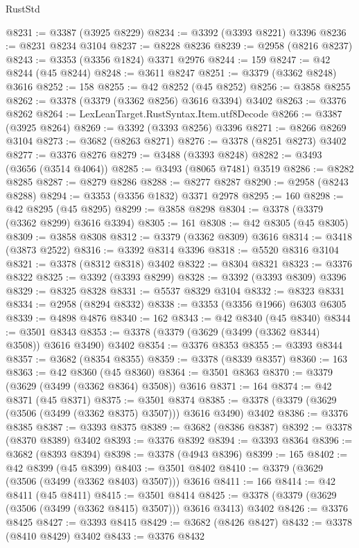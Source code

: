 \begin{lexlean}{RustStd}
\begin{coremodule}
@8231 := @3387 (@3925 @8229)
@8234 := @3392 (@3393 @8221) @3396
@8236 := @8231 @8234 @3104
@8237 := @8228 @8236
@8239 := @2958 (@8216 @8237)
@8243 := @3353 (@3356 @1824) @3371 @2976
@8244 := 159
@8247 := @42 @8244 (@45 @8244)
@8248 := @3611 @8247
@8251 := @3379 (@3362 @8248) @3616
@8252 := 158
@8255 := @42 @8252 (@45 @8252)
@8256 := @3858 @8255
@8262 := @3378 (@3379 (@3362 @8256) @3616 @3394) @3402
@8263 := @3376 @8262
@8264 := LexLeanTarget.RustSyntax.Item.utf8Decode
@8266 := @3387 (@3925 @8264)
@8269 := @3392 (@3393 @8256) @3396
@8271 := @8266 @8269 @3104
@8273 := @3682 (@8263 @8271)
@8276 := @3378 (@8251 @8273) @3402
@8277 := @3376 @8276
@8279 := @3488 (@3393 @8248)
@8282 := @3493 (@3656 (@3514 @4064))
@8285 := @3493 (@8065 @7481) @3519
@8286 := @8282 @8285
@8287 := @8279 @8286
@8288 := @8277 @8287
@8290 := @2958 (@8243 @8288)
@8294 := @3353 (@3356 @1832) @3371 @2978
@8295 := 160
@8298 := @42 @8295 (@45 @8295)
@8299 := @3858 @8298
@8304 := @3378 (@3379 (@3362 @8299) @3616 @3394)
@8305 := 161
@8308 := @42 @8305 (@45 @8305)
@8309 := @3858 @8308
@8312 := @3379 (@3362 @8309) @3616
@8314 := @3418 (@3873 @2522)
@8316 := @3392 @8314 @3396
@8318 := @5520 @8316 @3104
@8321 := @3378 (@8312 @8318) @3402
@8322 := @8304 @8321
@8323 := @3376 @8322
@8325 := @3392 (@3393 @8299)
@8328 := @3392 (@3393 @8309) @3396
@8329 := @8325 @8328
@8331 := @5537 @8329 @3104
@8332 := @8323 @8331
@8334 := @2958 (@8294 @8332)
@8338 := @3353 (@3356 @1966) @6303 @6305
@8339 := @4898 @4876
@8340 := 162
@8343 := @42 @8340 (@45 @8340)
@8344 := @3501 @8343
@8353 := @3378 (@3379 (@3629 (@3499 (@3362 @8344) @3508)) @3616 @3490) @3402
@8354 := @3376 @8353
@8355 := @3393 @8344
@8357 := @3682 (@8354 @8355)
@8359 := @3378 (@8339 @8357)
@8360 := 163
@8363 := @42 @8360 (@45 @8360)
@8364 := @3501 @8363
@8370 := @3379 (@3629 (@3499 (@3362 @8364) @3508)) @3616
@8371 := 164
@8374 := @42 @8371 (@45 @8371)
@8375 := @3501 @8374
@8385 := @3378 (@3379 (@3629 (@3506 (@3499 (@3362 @8375) @3507))) @3616 @3490) @3402
@8386 := @3376 @8385
@8387 := @3393 @8375
@8389 := @3682 (@8386 @8387)
@8392 := @3378 (@8370 @8389) @3402
@8393 := @3376 @8392
@8394 := @3393 @8364
@8396 := @3682 (@8393 @8394)
@8398 := @3378 (@4943 @8396)
@8399 := 165
@8402 := @42 @8399 (@45 @8399)
@8403 := @3501 @8402
@8410 := @3379 (@3629 (@3506 (@3499 (@3362 @8403) @3507))) @3616
@8411 := 166
@8414 := @42 @8411 (@45 @8411)
@8415 := @3501 @8414
@8425 := @3378 (@3379 (@3629 (@3506 (@3499 (@3362 @8415) @3507))) @3616 @3413) @3402
@8426 := @3376 @8425
@8427 := @3393 @8415
@8429 := @3682 (@8426 @8427)
@8432 := @3378 (@8410 @8429) @3402
@8433 := @3376 @8432

\end{coremodule}
\end{lexlean}
